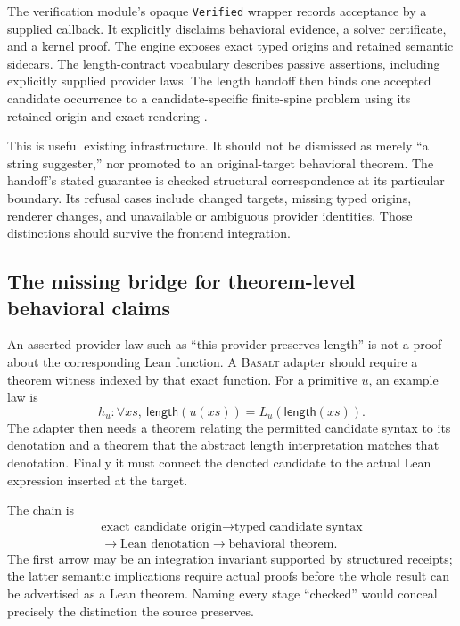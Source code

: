 \documentclass[11pt,a4paper]{article}
\newcommand{\Basalt}{\textsc{Basalt}}
\newcommand{\code}[1]{\nolinkurl{#1}}
\newcommand{\length}{\mathsf{length}}
\theoremstyle{plain}
\theoremstyle{definition}
\theoremstyle{remark}
\begin{document}
The verification module's opaque \code{Verified} wrapper records acceptance
by a supplied callback. It explicitly disclaims behavioral evidence, a solver
certificate, and a kernel proof. The engine exposes exact typed origins and
retained semantic sidecars. The length-contract vocabulary describes passive
assertions, including explicitly supplied provider laws. The length handoff
then binds one accepted candidate occurrence to a candidate-specific
finite-spine problem using its retained origin and exact rendering
\cite{leantverification,leantengine,leantcontract,leanthandoff}.

This is useful existing infrastructure. It should not be dismissed as merely
``a string suggester,'' nor promoted to an original-target behavioral theorem.
The handoff's stated guarantee is checked structural correspondence at its
particular boundary. Its refusal cases include changed targets, missing typed
origins, renderer changes, and unavailable or ambiguous provider identities.
Those distinctions should survive the frontend integration.

\subsection{The missing bridge for theorem-level behavioral claims}
An asserted provider law such as ``this provider preserves length'' is not
a proof about the corresponding Lean function. A \Basalt{} adapter should
require a theorem witness indexed by that exact function. For a primitive
$u$, an example law is
\[
 h_u:\forall xs,\ \length(u(xs))=L_u(\length(xs)).
\]
The adapter then needs a theorem relating the permitted candidate syntax to
its denotation and a theorem that the abstract length interpretation matches
that denotation. Finally it must connect the denoted candidate to the actual
Lean expression inserted at the target.

The chain is
\[
 \begin{gathered}
 \text{exact candidate origin}\longrightarrow\text{typed candidate syntax}\\
 \longrightarrow\text{Lean denotation}\longrightarrow\text{behavioral theorem}.
 \end{gathered}
\]
The first arrow may be an integration invariant supported by structured
receipts; the latter semantic implications require actual proofs before the
whole result can be advertised as a Lean theorem. Naming every stage
``checked'' would conceal precisely the distinction the source preserves.
\end{document}
